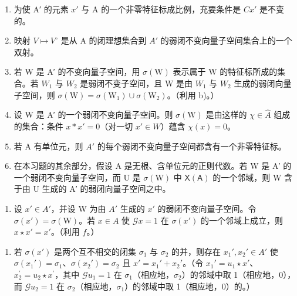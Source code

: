 \begin{enumerate}
\def\labelenumi{\alph{enumi})}
\item
  为使 A′ 的元素 \(x'\) 与 A 的一个非零特征标成比例，充要条件是 \(Cx'\) 是不变的。
\item
  映射 \(V \mapsto V^{\circ}\) 是从 A 的闭理想集合到 \(A'\) 的弱闭不变向量子空间集合上的一个双射。
\item
  若 W 是 A′ 的不变向量子空间，用 \(\sigma(\mathrm{W})\) 表示属于 W 的特征标所成的集合。若 \(W_{1}\) 与 \(W_{2}\) 是弱闭不变子空间，且 W 是由 \(W_{1}\) 与 \(W_{2}\) 生成的弱闭向量子空间，则 \(\sigma(\mathrm{W}) = \sigma(\mathrm{W}_{1}) \cup \sigma(\mathrm{W}_{2})\)。（利用 b)。）
\item
  设 W 是 A′ 的一个弱闭不变向量子空间。则 \(\sigma(\mathrm{W})\) 是由这样的 \(\chi \in \widehat{A}\) 组成的集合：条件 \(x * x' = 0\)（对一切 \(x' \in W\)）蕴含 \(\chi(x) = 0\)。
\item
  若 A 有单位元，则 \(A'\) 的每个弱闭不变向量子空间都含有一个非零特征标。
\item
  在本习题的其余部分，假设 A 是无根、含单位元的正则代数。若 W 是 A′ 的一个弱闭不变向量子空间，而 U 是 \(\sigma(\mathrm{W})\) 中 \(\mathsf{X}(\mathsf{A})\) 的一个邻域，则 W 含于由 U 生成的 A′ 的弱闭向量子空间之中。
\end{enumerate}

\begin{enumerate}
\def\labelenumi{\alph{enumi})}
\setcounter{enumi}{6}
\tightlist
\item
  设 \(x' \in A'\)，并设 W 为由 \(A'\) 生成的 \(x'\) 的弱闭不变向量子空间。令 \(\sigma(x') = \sigma(\mathrm{W})\)。若 \(x \in A\) 使 \(\mathcal{G}x = 1\) 在 \(\sigma(x')\) 的一个邻域上成立，则 \(x \star x' = x'\)。（利用 \(f\)。）
\end{enumerate}

\begin{enumerate}
\def\labelenumi{\alph{enumi})}
\setcounter{enumi}{7}
\tightlist
\item
  若 \(\sigma(x')\) 是两个互不相交的闭集 \(\sigma_1\) 与 \(\sigma_2\) 的并，则存在 \(x_1', x_2' \in A'\) 使 \(\sigma(x_1') = \sigma_1\)、\(\sigma(x_2') = \sigma_2\) 且 \(x' = x_1' + x_2'\)。（令 \(x_1' = u_1 \star x'\)、\(x_{2}^{\prime}=u_{2}\star x^{\prime}\)，其中 \(\mathcal{G}u_{1}=1\) 在 \(\sigma_{1}\)（相应地，\(\sigma_{2}\)）的邻域中取 1（相应地，0），而 \(\mathcal{G}u_{2}=1\) 在 \(\sigma_{2}\)（相应地，\(\sigma_{1}\)）的邻域中取 1（相应地，0）的。）
\end{enumerate}

